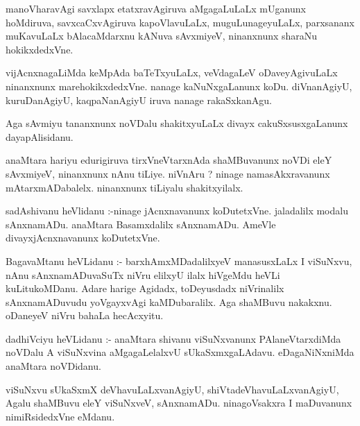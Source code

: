 \documentclass{article}
\begin{document}
\begin{mn}
manoVharavAgi  savxlapx  etatxravAgiruva  aMgagaLuLaLx  mUganunx  hoMdiruva,  savxcaCxvAgiruva  kapoVlavuLaLx,  
muguLunageyuLaLx,  parxsananx  muKavuLaLx  bAlacaMdarxnu  kANuva  sAvxmiyeV,  ninanxnunx  sharaNu hokikxdedxVne.
\end{mn}

\begin{mn}
vijAcnxnagaLiMda  keMpAda  baTeTxyuLaLx,  veVdagaLeV  oDaveyAgivuLaLx  ninanxnunx  marehokikxdedxVne.  
nanage  kaNuNxgaLanunx  koDu.  diVnanAgiyU,  kuruDanAgiyU,  kaqpaNanAgiyU  iruva  nanage  rakaSxkanAgu.
\end{mn}

\begin{mn}
Aga  sAvmiyu  tananxnunx  noVDalu  shakitxyuLaLx  divayx  cakuSxsusxgaLanunx  dayapAlisidanu.
\end{mn}

\begin{mn}
anaMtara  hariyu  edurigiruva  tirxVneVtarxnAda  shaMBuvanunx  noVDi  eleY  sAvxmiyeV,  ninanxnunx  
nAnu  tiLiye.  niVnAru ?  ninage  namasAkxravanunx  mAtarxmADabalelx. ninanxnunx  tiLiyalu  shakitxyilalx.
\end{mn}

\begin{mn}
sadAshivanu  heVlidanu :-ninage jAcnxnavanunx  koDutetxVne.  jaladalilx  modalu  sAnxnamADu.  anaMtara  
Basamxdalilx  sAnxnamADu.  AmeVle  divayxjAcnxnavanunx  koDutetxVne.
\end{mn}

\begin{mn}
BagavaMtanu  heVLidanu :- barxhAmxMDadalilxyeV  manasusxLaLx  I  viSuNxvu, nAnu  sAnxnamADuvaSuTx  niVru  
elilxyU  ilalx  hiVgeMdu  heVLi  kuLitukoMDanu.  Adare  harige  Agidadx,  toDeyusdadx  niVrinalilx  sAnxnamADuvudu  
yoVgayxvAgi  kaMDubaralilx.  Aga  shaMBuvu  nakakxnu.  oDaneyeV  niVru  bahaLa  hecAcxyitu.
\end{mn}

\begin{mn}
dadhiVciyu  heVLidanu :- anaMtara  shivanu  viSuNxvanunx  PAlaneVtarxdiMda  noVDalu  A  viSuNxvina  
aMgagaLelalxvU  sUkaSxmxgaLAdavu.  eDagaNiNxniMda  anaMtara  noVDidanu.
\end{mn}

\begin{mn}
viSuNxvu  sUkaSxmX deVhavuLaLxvanAgiyU,  shiVtadeVhavuLaLxvanAgiyU,  Agalu  shaMBuvu  eleY  viSuNxveV,  
sAnxnamADu.  ninagoVsakxra   I  maDuvanunx  nimiRsidedxVne  eMdanu.
\end{mn}
\end{document}
